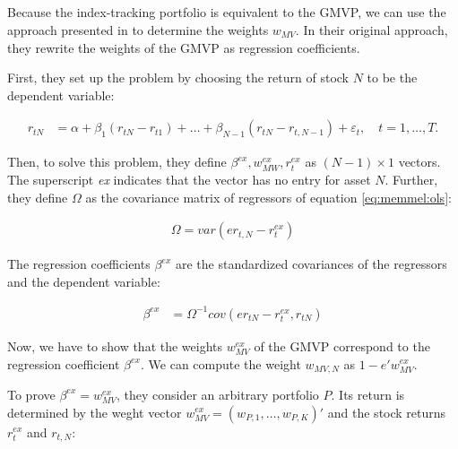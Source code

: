 \documentclass[12pt,oneside,a4paper]{memoir}
\begin{document}
\subsection{}
Because the index-tracking portfolio is equivalent to the GMVP, we can use the approach presented in  to determine the weights $w_{MV}$.
In their original approach, they rewrite the weights of the GMVP as regression coefficients.

First, they set up the problem by choosing the return of stock $N$ to be the dependent variable:

\vspace{-18 pt}
\begin{align}
\label{eq:memmel:ols}
r_{tN} &= \alpha + \beta_{1}(r_{tN}-r_{t1}) + \dots + \beta_{N-1}(r_{tN}-r_{t,N-1})
+ \varepsilon_{t},
\quad
t=1, \dots, T.
\end{align}

\noindent
Then, to solve this problem, they define $\beta^{ex}, w_{MW}^{ex}, r_{t}^{ex}$ as $(N-1) \times 1$ vectors.
The superscript \textit{ex} indicates that the vector has no entry for asset $N$.
Further, they define $\Omega$ as the covariance matrix of regressors of equation \eqref{eq:memmel:ols}:

\vspace{-18 pt}
\begin{align*}
	\Omega = var( e r_{t, N}  - r_{t}^{ex} )
\end{align*}

The regression coefficients $\beta^{ex}$ are the standardized covariances of the regressors and the dependent variable:

\vspace{-18 pt}
\begin{align}
\label{eq:bex}
\beta^{ex} &= \Omega^{-1} cov(e r_{tN} - r_{t}^{ex}, r_{tN})
\end{align}

Now, we have to show that the weights $w_{MV}^{ex}$ of the GMVP correspond to the regression coefficient $\beta^{ex}$.
We can compute the weight $w_{MV, N}$ as $1 - e'w_{MV}^{ex}$.

To prove $\beta^{ex} = w^{ex}_{MV}$, they consider an arbitrary portfolio $P$.
Its return is determined by the weght vector $w^{ex}_{MV}=(w_{P,1}, \dots, w_{P, K})'$ and the stock returns $r^{ex}_{t}$ and $r_{t, N}$:
\end{document}
